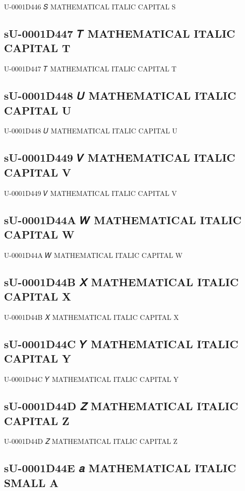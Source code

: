 U-0001D446 𝑆 MATHEMATICAL ITALIC CAPITAL S

\subsection{sU-0001D447 𝑇 MATHEMATICAL ITALIC CAPITAL T}

U-0001D447 𝑇 MATHEMATICAL ITALIC CAPITAL T

\subsection{sU-0001D448 𝑈 MATHEMATICAL ITALIC CAPITAL U}

U-0001D448 𝑈 MATHEMATICAL ITALIC CAPITAL U

\subsection{sU-0001D449 𝑉 MATHEMATICAL ITALIC CAPITAL V}

U-0001D449 𝑉 MATHEMATICAL ITALIC CAPITAL V

\subsection{sU-0001D44A 𝑊 MATHEMATICAL ITALIC CAPITAL W}

U-0001D44A 𝑊 MATHEMATICAL ITALIC CAPITAL W

\subsection{sU-0001D44B 𝑋 MATHEMATICAL ITALIC CAPITAL X}

U-0001D44B 𝑋 MATHEMATICAL ITALIC CAPITAL X

\subsection{sU-0001D44C 𝑌 MATHEMATICAL ITALIC CAPITAL Y}

U-0001D44C 𝑌 MATHEMATICAL ITALIC CAPITAL Y

\subsection{sU-0001D44D 𝑍 MATHEMATICAL ITALIC CAPITAL Z}

U-0001D44D 𝑍 MATHEMATICAL ITALIC CAPITAL Z

\subsection{sU-0001D44E 𝑎 MATHEMATICAL ITALIC SMALL A}

